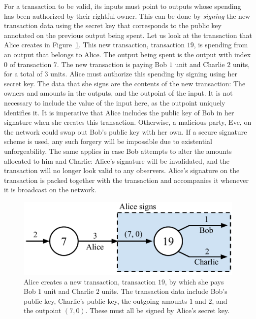 For a transaction to be valid, its inputs must point to outputs whose spending has
been authorized by their rightful owner. This can be done by \emph{signing} the new transaction
data using the secret key that corresponds to the public key annotated on the previous output
being spent.
Let us look at the transaction that Alice creates in Figure~\ref{fig.utxo-sig}. This
new transaction, transaction $19$, is spending from an output that belongs to Alice.
The output being spent is the output with index $0$ of transaction $7$.
The new transaction is paying Bob $1$ unit and Charlie $2$ units, for a total of
$3$ units.
Alice must authorize this spending by signing using her secret key.
The data that she signs are the contents of the new transaction:
The owners and amounts in the outputs, and the outpoint of the input.
It is not necessary to include the value of the input here, as the outpoint
uniquely identifies it. It is imperative that Alice includes the public key
of Bob in her signature when she creates this transaction. Otherwise, a malicious
party, Eve, on the network could swap out Bob's public key with her own. If a secure
signature scheme is used, any such forgery will be impossible due to existential
unforgeability. The same applies in case Bob attempts to alter the amounts allocated
to him and Charlie: Alice's signature will be invalidated, and the transaction will
no longer look valid to any observers. Alice's signature on the transaction is packed
together with the transaction and accompanies it whenever it is broadcast on the network.

\begin{figure}[h]
    \centering
    \includegraphics[width=0.65 \columnwidth,keepaspectratio]{figures/utxo-sig.pdf}
    \caption{Alice creates a new transaction, transaction $19$, by which she pays Bob
             $1$ unit
             and Charlie $2$ units.
             The transaction data include Bob's public key, Charlie's public key,
             the outgoing amounts $1$ and $2$, and the outpoint $(7, 0)$.
             These must all be signed by Alice's secret key.}
    \label{fig.utxo-sig}
\end{figure}


